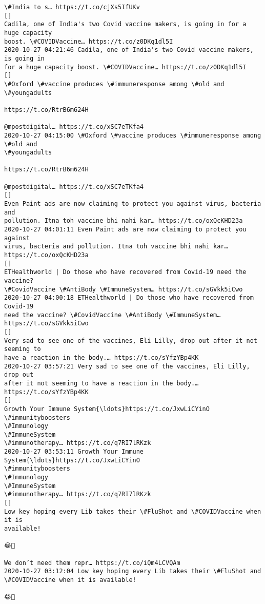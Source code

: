 \documentclass[11pt]{article}
\begin{document}
\begin{Verbatim}[commandchars=\\\{\}]
\#India to s… https://t.co/cjXs5IfUKv
[]
Cadila, one of India's two Covid vaccine makers, is going in for a huge capacity
boost. \#COVIDVaccine… https://t.co/z0DKq1dl5I
2020-10-27 04:21:46 Cadila, one of India's two Covid vaccine makers, is going in
for a huge capacity boost. \#COVIDVaccine… https://t.co/z0DKq1dl5I
[]
\#Oxford \#vaccine produces \#immuneresponse among \#old and \#youngadults

https://t.co/RtrB6m624H

@mpostdigital… https://t.co/xSC7eTKfa4
2020-10-27 04:15:00 \#Oxford \#vaccine produces \#immuneresponse among \#old and
\#youngadults

https://t.co/RtrB6m624H

@mpostdigital… https://t.co/xSC7eTKfa4
[]
Even Paint ads are now claiming to protect you against virus, bacteria and
pollution. Itna toh vaccine bhi nahi kar… https://t.co/oxQcKHD23a
2020-10-27 04:01:11 Even Paint ads are now claiming to protect you against
virus, bacteria and pollution. Itna toh vaccine bhi nahi kar…
https://t.co/oxQcKHD23a
[]
ETHealthworld | Do those who have recovered from Covid-19 need the vaccine?
\#CovidVaccine \#AntiBody \#ImmuneSystem… https://t.co/sGVkk5iCwo
2020-10-27 04:00:18 ETHealthworld | Do those who have recovered from Covid-19
need the vaccine? \#CovidVaccine \#AntiBody \#ImmuneSystem… https://t.co/sGVkk5iCwo
[]
Very sad to see one of the vaccines, Eli Lilly, drop out after it not seeming to
have a reaction in the body.… https://t.co/sYfzYBp4KK
2020-10-27 03:57:21 Very sad to see one of the vaccines, Eli Lilly, drop out
after it not seeming to have a reaction in the body.… https://t.co/sYfzYBp4KK
[]
Growth Your Immune System{\ldots}https://t.co/JxwLiCYinO
\#immunityboosters
\#Immunology
\#ImmuneSystem
\#immunotherapy… https://t.co/q7RI7lRKzk
2020-10-27 03:53:11 Growth Your Immune System{\ldots}https://t.co/JxwLiCYinO
\#immunityboosters
\#Immunology
\#ImmuneSystem
\#immunotherapy… https://t.co/q7RI7lRKzk
[]
Low key hoping every Lib takes their \#FluShot and \#COVIDVaccine when it is
available!

😂🤣

We don’t need them repr… https://t.co/iQm4LCVQAm
2020-10-27 03:12:04 Low key hoping every Lib takes their \#FluShot and
\#COVIDVaccine when it is available!

😂🤣


\end{Verbatim}
\end{document}

